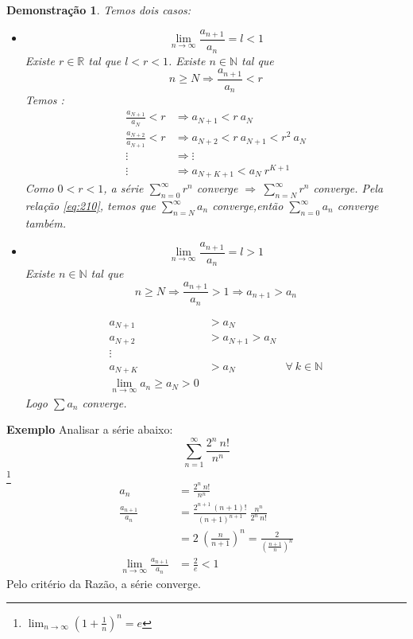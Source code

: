 \documentclass[12pt,openany, letterpaper]{book}
\newtheorem{demonstration}{Demonstração}
\begin{document}
\begin{demonstration}
Temos dois casos:
\begin{itemize}
\item [a.] $$\lim_{n \rightarrow \infty} \frac{a_{n+1}}{a_n} = l < 1 $$ Existe $r \in \mathds{R}$ tal que $l < r < 1$. Existe $n \in \mathds{N}$  tal que $$ n \geq N \Rightarrow \frac{a_{n+1}}{a_n} < r$$
Temos : \begin{align}
\frac{a_{N+1}}{a_N} < r &\Rightarrow  a_{N+1} < r\ a_N \\
\frac{a_{N+2}}{a_{N+1}} < r &\Rightarrow  a_{N+2} < r\ a_{N+1} < r^2\ a_N \\
\vdots &\Rightarrow \vdots \\
\vdots &\Rightarrow a_{N+K+1} < a_N\  r^{K+1} \label{eq:210}
\end{align}
Como $0 < r < 1$, a série $\displaystyle{\sum_{n=0}^{\infty} r^n}$ converge $\displaystyle{\Rightarrow \ \sum_{n=N}^{\infty} r^n}$ converge.
Pela relação \ref{eq:210}, temos que $\displaystyle{\sum_{n=N}^{\infty} a_n}$ converge,então $\displaystyle{\sum_{n=0}^{\infty} a_n}$ converge também.
\item [b.] $$\lim_{n \rightarrow \infty} \frac{a_{n+1}}{a_n} = l > 1 $$ Existe $n \in \mathds{N}$  tal que $$ n \geq N \Rightarrow \frac{a_{n+1}}{a_n} > 1 \Rightarrow a_{n+1} > a_n $$

\begin{align*}
a_{N+1} &> a_N \\
a_{N+2} &> a_{N+1} > a_N\\
\vdots\\
a_{N+K} &> a_N & \forall \ k \in \mathds{N}\\
\lim_{n \rightarrow \infty} a_n \geq a_N > 0
\end{align*}
Logo $\sum a_n$ converge.
\end{itemize}
\end{demonstration}

\hspace{5mm}\textbf{Exemplo} Analisar a série abaixo: $$\sum_{n=1}^{\infty} \frac{2^n \ n!}{n^n}$$ \footnote{$\displaystyle{\lim_{n \rightarrow \infty} \left( 1 + \frac{1}{n} \right)^n = e}$}
\begin{align*}
a_n &= \frac{2^n \ n!}{n^n} \\
\frac{a_{n+1}}{a_n} &=  \frac{2^{n+1} \ (n+1)!}{(n+1)^{n+1}} \ \frac{n^n}{2^n \ n!} \\
&= 2\ \left( \frac{n}{n+1}\right)^n = \frac{2}{\left( \frac{n+1}{n}\right)^n}\\
\lim_{n \rightarrow \infty} \frac{a_{n+1}}{a_n} &= \frac{2}{e} < 1 
\end{align*}
Pelo critério da Razão, a série converge.
\end{document}
